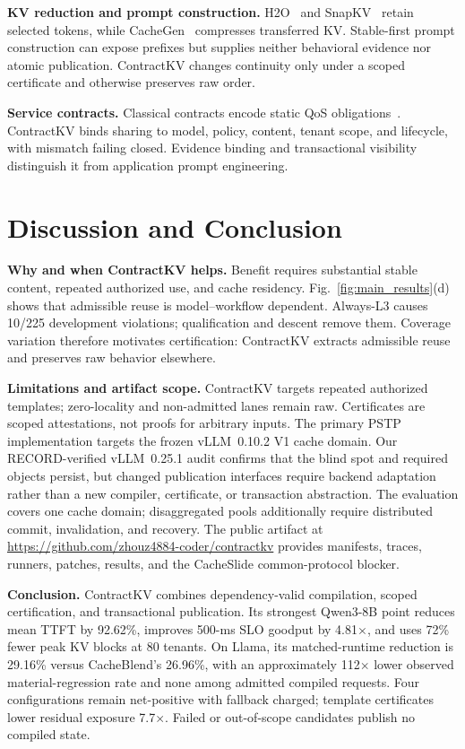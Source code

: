 \documentclass[journal]{IEEEtran}
\begin{document}
\smallskip
\noindent\textbf{KV reduction and prompt construction.}
H2O~\cite{h2o2023} and SnapKV~\cite{snapkv2024} retain selected tokens, while CacheGen~\cite{llmcachegen2024} compresses transferred KV. Stable-first prompt construction can expose prefixes but supplies neither behavioral evidence nor atomic publication. ContractKV changes continuity only under a scoped certificate and otherwise preserves raw order.

\smallskip
\noindent\textbf{Service contracts.}
Classical contracts encode static QoS obligations~\cite{qosmulti2020}. ContractKV binds sharing to model, policy, content, tenant scope, and lifecycle, with mismatch failing closed. Evidence binding and transactional visibility distinguish it from application prompt engineering.

\section{Discussion and Conclusion}
\label{sec:conclusion}

\noindent\textbf{Why and when ContractKV helps.}
Benefit requires substantial stable content, repeated authorized use, and cache residency. Fig.~\ref{fig:main_results}(d) shows that admissible reuse is model--workflow dependent. Always-L3 causes 10/225 development violations; qualification and descent remove them. Coverage variation therefore motivates certification: ContractKV extracts admissible reuse and preserves raw behavior elsewhere.

\smallskip
\noindent\textbf{Limitations and artifact scope.}
ContractKV targets repeated authorized templates; zero-locality and non-admitted lanes remain raw. Certificates are scoped attestations, not proofs for arbitrary inputs. The primary PSTP implementation targets the frozen vLLM~0.10.2 V1 cache domain. Our RECORD-verified vLLM~0.25.1 audit confirms that the blind spot and required objects persist, but changed publication interfaces require backend adaptation rather than a new compiler, certificate, or transaction abstraction. The evaluation covers one cache domain; disaggregated pools additionally require distributed commit, invalidation, and recovery. The public artifact at \url{https://github.com/zhouz4884-coder/contractkv} provides manifests, traces, runners, patches, results, and the CacheSlide common-protocol blocker.

\smallskip
\noindent\textbf{Conclusion.}
ContractKV combines dependency-valid compilation, scoped certification, and transactional publication. Its strongest Qwen3-8B point reduces mean TTFT by 92.62\%, improves 500-ms SLO goodput by 4.81$\times$, and uses 72\% fewer peak KV blocks at 80 tenants. On Llama, its matched-runtime reduction is 29.16\% versus CacheBlend's 26.96\%, with an approximately 112$\times$ lower observed material-regression rate and none among admitted compiled requests. Four configurations remain net-positive with fallback charged; template certificates lower residual exposure 7.7$\times$. Failed or out-of-scope candidates publish no compiled state.
\end{document}
